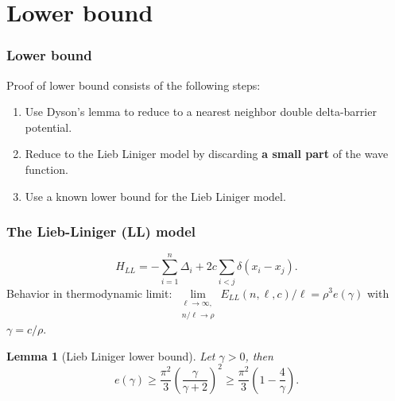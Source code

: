 \documentclass{beamer}[10]
\newtheorem{mlemma}{Lemma}
\begin{document}
\section{Lower bound}

\begin{frame}
	\frametitle{Lower bound}
	Proof of lower bound consists of the following steps:
	\begin{enumerate}
		\item Use Dyson's lemma to reduce to a nearest neighbor double delta-barrier potential.
		\item Reduce to the Lieb Liniger model by discarding \textbf{a small part} of the wave function.
		\item Use a known lower bound for the Lieb Liniger model.
	\end{enumerate}	
\end{frame}

\begin{frame}
	\frametitle{The Lieb-Liniger (LL) model}
	\begin{block}{}
	\begin{equation}
	H_{LL}=-\sum_{i=1}^{n}\Delta_i+2c\sum_{i<j}\delta(x_i-x_j).
	\end{equation}
	Behavior in thermodynamic limit: $ \lim\limits_{\substack{\ell\to\infty,\\ n/\ell\to \rho}}E_{LL}(n,\ell,c)/\ell=\rho^3 e(\gamma) $ with $ \gamma=c/\rho  $.
		\begin{mlemma}[Lieb Liniger lower bound] \label{LemmaLL-LowerBound}
			Let $ \gamma>0 $, then
			\begin{equation}
			e(\gamma)\geq \frac{\pi^2}{3}\left(\frac{\gamma}{\gamma+2}\right)^2\geq \frac{\pi^2}{3}\left(1-\frac{4}{\gamma}\right).
			\end{equation}
		\end{mlemma}
	\end{block}	
\end{frame}
\end{document}
